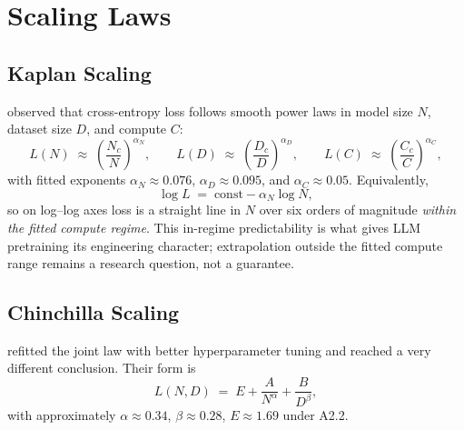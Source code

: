 \section{Scaling Laws}

\subsection{Kaplan Scaling}

\citet{kaplan2020scaling} observed that cross-entropy loss follows
smooth power laws in model size $N$, dataset size $D$, and compute $C$:
\begin{equation}
\label{eq:ch2-kaplan}
L(N) \;\approx\; \left(\frac{N_c}{N}\right)^{\alpha_N},
\qquad
L(D) \;\approx\; \left(\frac{D_c}{D}\right)^{\alpha_D},
\qquad
L(C) \;\approx\; \left(\frac{C_c}{C}\right)^{\alpha_C},
\end{equation}
with fitted exponents $\alpha_N \approx 0.076$,
$\alpha_D \approx 0.095$, and $\alpha_C \approx 0.05$. Equivalently,
\[
\log L \;=\; \mathrm{const} - \alpha_N \log N,
\]
so on log--log axes loss is a straight line in $N$ over six orders of
magnitude \emph{within the fitted compute regime}. This in-regime
predictability is what gives LLM pretraining its engineering
character; extrapolation outside the fitted compute range remains
a research question, not a guarantee.

\subsection{Chinchilla Scaling}

\citet{hoffmann2022chinchilla} refitted the joint law with better
hyperparameter tuning and reached a very different conclusion. Their
form is
\begin{equation}
\label{eq:ch2-chinchilla}
L(N, D) \;=\; E + \frac{A}{N^{\alpha}} + \frac{B}{D^{\beta}},
\end{equation}
with approximately $\alpha \approx 0.34$, $\beta \approx 0.28$,
$E \approx 1.69$ under A2.2.

